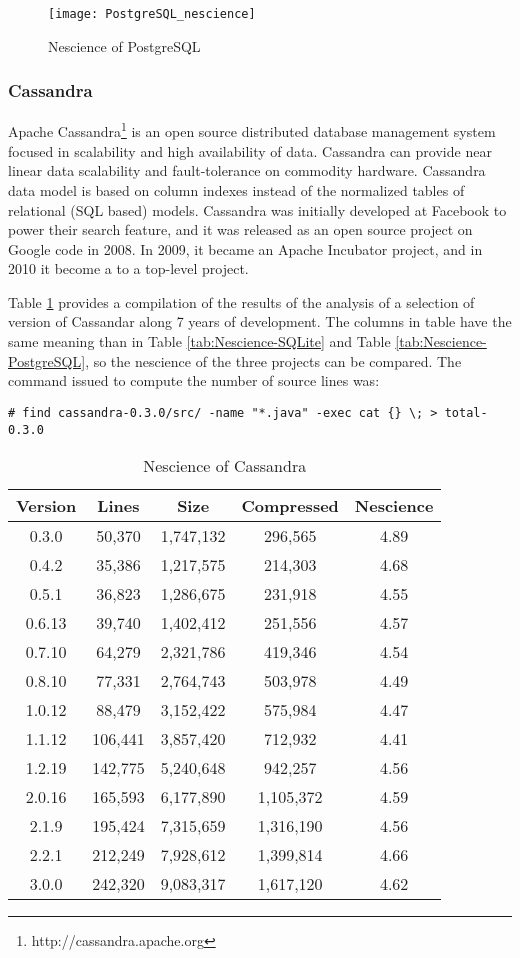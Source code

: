 \begin{figure}[h]
\centering\texttt{[image: PostgreSQL\_nescience]}
\caption{\label{fig:Nescience-of-PostgreSQL}Nescience of PostgreSQL}
\end{figure}

\subsubsection*{Cassandra}

Apache Cassandra\footnote{http://cassandra.apache.org} is an open source distributed database management system focused in scalability and high availability of data. Cassandra can provide near linear data scalability and fault-tolerance on commodity hardware. Cassandra data model is based on column indexes instead of the normalized tables of relational (SQL based) models. Cassandra was initially developed at Facebook to power their search feature, and it was released as an open source project on Google code in 2008. In 2009, it became an Apache Incubator project, and in 2010 it become a to a top-level project.

Table \ref{tab:Nescience-Cassandra} provides a compilation of the results of the analysis of a selection of version of Cassandar along 7 years of development. The columns in table have the same meaning than in Table \ref{tab:Nescience-SQLite} and Table \ref{tab:Nescience-PostgreSQL}, so the nescience of the three projects can be compared. The command issued to compute the number of source lines was:

\begin{verbatim}
# find cassandra-0.3.0/src/ -name "*.java" -exec cat {} \; > total-0.3.0
\end{verbatim}

\begin{table}
\begin{centering}
\begin{tabular}{|c|c|c|c|c|}
\hline 
Version & Lines & Size & Compressed & Nescience\tabularnewline
\hline 
\hline
0.3.0 & 50,370 & 1,747,132 & 296,565 & 4.89 \tabularnewline
\hline
0.4.2 & 35,386 & 1,217,575 & 214,303 & 4.68 \tabularnewline
\hline
0.5.1 & 36,823 & 1,286,675 & 231,918 & 4.55 \tabularnewline
\hline
0.6.13 & 39,740 & 1,402,412 & 251,556 & 4.57 \tabularnewline
\hline
0.7.10 & 64,279 & 2,321,786 & 419,346 & 4.54 \tabularnewline
\hline
0.8.10 & 77,331 & 2,764,743 & 503,978 & 4.49 \tabularnewline
\hline
1.0.12 & 88,479 & 3,152,422 & 575,984 & 4.47 \tabularnewline
\hline
1.1.12 & 106,441 & 3,857,420 & 712,932 & 4.41 \tabularnewline
\hline
1.2.19 & 142,775 & 5,240,648 & 942,257 & 4.56 \tabularnewline
\hline
2.0.16 & 165,593 & 6,177,890 & 1,105,372 & 4.59 \tabularnewline
\hline
2.1.9 & 195,424 & 7,315,659 & 1,316,190 & 4.56 \tabularnewline
\hline
2.2.1 & 212,249 & 7,928,612 & 1,399,814 & 4.66 \tabularnewline
\hline
3.0.0 & 242,320 & 9,083,317 & 1,617,120 & 4.62 \tabularnewline
\hline
\end{tabular}
\par\end{centering}
\caption{\label{tab:Nescience-Cassandra}Nescience of Cassandra}
\end{table}

